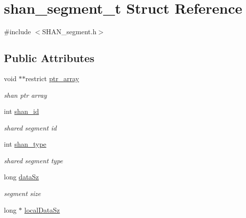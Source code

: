 \hypertarget{structshan__segment__t}{}\section{shan\+\_\+segment\+\_\+t Struct Reference}
\label{structshan__segment__t}


{\ttfamily \#include $<$S\+H\+A\+N\+\_\+segment.\+h$>$}

\subsection*{Public Attributes}
\begin{DoxyCompactItemize}
\item 
void $\ast$$\ast$restrict \hyperlink{structshan__segment__t_a2ec15787570192a7727f626b93b1e3f2}{ptr\+\_\+array}\hypertarget{structshan__segment__t_a2ec15787570192a7727f626b93b1e3f2}{}\label{structshan__segment__t_a2ec15787570192a7727f626b93b1e3f2}

\begin{DoxyCompactList}\small\item\em shan ptr array \end{DoxyCompactList}\item 
int \hyperlink{structshan__segment__t_a7fc2a9c4ec895c92e874d61e9f5bd5f8}{shan\+\_\+id}\hypertarget{structshan__segment__t_a7fc2a9c4ec895c92e874d61e9f5bd5f8}{}\label{structshan__segment__t_a7fc2a9c4ec895c92e874d61e9f5bd5f8}

\begin{DoxyCompactList}\small\item\em shared segment id \end{DoxyCompactList}\item 
int \hyperlink{structshan__segment__t_a4730e781a4ddde44a0d6d60b14abf100}{shan\+\_\+type}\hypertarget{structshan__segment__t_a4730e781a4ddde44a0d6d60b14abf100}{}\label{structshan__segment__t_a4730e781a4ddde44a0d6d60b14abf100}

\begin{DoxyCompactList}\small\item\em shared segment type \end{DoxyCompactList}\item 
long \hyperlink{structshan__segment__t_a55fbd0ba1fdb9e79c43ad9f5d491ee1e}{data\+Sz}\hypertarget{structshan__segment__t_a55fbd0ba1fdb9e79c43ad9f5d491ee1e}{}\label{structshan__segment__t_a55fbd0ba1fdb9e79c43ad9f5d491ee1e}

\begin{DoxyCompactList}\small\item\em segment size \end{DoxyCompactList}\item 
long $\ast$ \hyperlink{structshan__segment__t_a728fe9b7f733a51569a8ede8eebe2771}{local\+Data\+Sz}\hypertarget{structshan__segment__t_a728fe9b7f733a51569a8ede8eebe2771}{}\label{structshan__segment__t_a728fe9b7f733a51569a8ede8eebe2771}


\end{DoxyCompactItemize}
